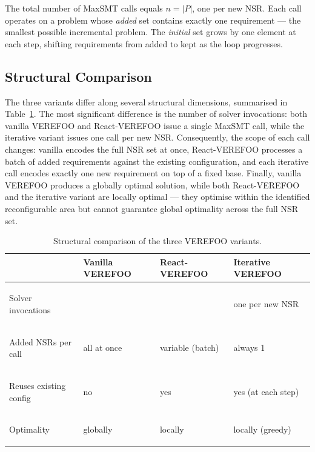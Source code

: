The total number of MaxSMT calls equals $n = |P|$, one per new NSR. Each call operates on a problem whose \textit{added} set contains exactly one requirement — the smallest possible incremental problem. The \textit{initial} set grows by one element at each step, shifting requirements from added to kept as the loop progresses.


\subsection{Structural Comparison}

The three variants differ along several structural dimensions, summarised in Table~\ref{tab:structural-comparison}. The most significant difference is the number of solver invocations: both vanilla VEREFOO and React-VEREFOO issue a single MaxSMT call, while the iterative variant issues one call per new NSR. Consequently, the scope of each call changes: vanilla encodes the full NSR set at once, React-VEREFOO processes a batch of added requirements against the existing configuration, and each iterative call encodes exactly one new requirement on top of a fixed base. Finally, vanilla VEREFOO produces a globally optimal solution, while both React-VEREFOO and the iterative variant are locally optimal — they optimise within the identified reconfigurable area but cannot guarantee global optimality across the full NSR set.

\begin{table}[H]
\centering
\small
\renewcommand{\arraystretch}{1.8}
\caption{Structural comparison of the three VEREFOO variants.}
\label{tab:structural-comparison}
\begin{tabularx}{\textwidth}{>{\bfseries\raggedright\arraybackslash}p{3.8cm}>{\centering\arraybackslash}X>{\centering\arraybackslash}X>{\centering\arraybackslash}X}
\hline
 & \textbf{Vanilla VEREFOO} & \textbf{React-VEREFOO} & \textbf{Iterative VEREFOO} \\
\hline
Solver invocations     & 1                 & 1                   & one per new NSR    \\
Added NSRs per call    & all at once       & variable (batch)    & always 1           \\
Reuses existing config & no                & yes                 & yes (at each step) \\
Optimality             & globally  & locally & locally (greedy) \\
\hline
\end{tabularx}
\end{table}

